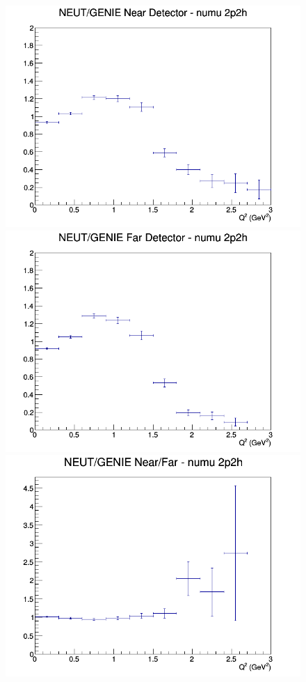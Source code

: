 \documentclass[12pt]{article}
\begin{document}
\begin{figure}[h]
\endminipage
\newline
{}
\includegraphics[width=\linewidth]{eff_Q2/LAr/ratios/2p2h_NEUT_GENIE_numu_near_Q2.png}
\endminipage
{}
\includegraphics[width=\linewidth]{eff_Q2/LAr/ratios/2p2h_NEUT_GENIE_numu_far_Q2.png}
\endminipage
{}
\includegraphics[width=\linewidth]{eff_Q2/LAr/ratios/2p2h_NEUT_GENIE_numu_NF_Q2.png}

\end{figure}
\end{document}

